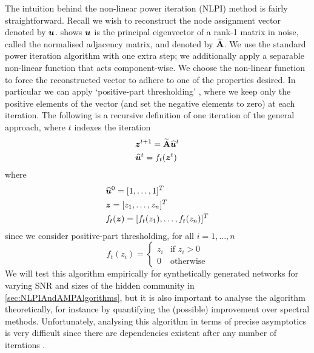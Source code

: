 The intuition behind the non-linear power iteration (NLPI) method is fairly straightforward.
Recall we wish to reconstruct the node assignment vector denoted by $\vecvar{u}$.  shows $\vecvar{u}$ is the principal eigenvector of a rank-1 matrix in noise, called the normalised adjacency matrix, and denoted by $\widetilde{\mathbf A}$.
We use the standard power iteration algorithm with one extra step; we additionally apply a separable non-linear function that acts component-wise.
We choose the non-linear function to force the reconstructed vector to adhere to one of the properties desired. In particular we can apply `positive-part thresholding' \cite{Mon13}, where we keep only the positive elements of the vector (and set the negative elements to zero) at each iteration.
The following is a recursive definition of one iteration of the general approach, where $t$ indexes the iteration
\begin{equation}
	\label{eq:NLPIAlgorithm}
	\begin{split}
		&\vecvar{z}^{t+1} = \widetilde{\matvar{A}} \widehat{\vecvar{u}}^{t} \\
		&\widehat{\vecvar{u}}^{t} = f_{t}(\vecvar{z}^{t})
	\end{split}
\end{equation}
where
\begin{equation}
	\label{eq:NLPIAlgorithmConditions}
	\begin{split}
		&\widehat{\vecvar{u}}^{0} = \transpose{[1,\dots,1]} \\
		&\vecvar{z} = \transpose{[z_{1},\dots,z_{n}]} \\
		&f_{t}(\vecvar{z}) = \transpose{[f_{t}(z_{1}),\dots,f_{t}(z_{n})]}
	\end{split}
\end{equation}
since we consider positive-part thresholding, for all $i=1,\dots,n$
\begin{equation}
	\label{eq:NLPIAlgorithmThresholding}
	f_{t}(z_{i}) =
	\begin{cases}
		z_{i}& \text{if } z_{i} > 0\\
		0 & \text{otherwise}
	\end{cases}
\end{equation}
We will test this algorithm empirically for synthetically generated networks for varying SNR and sizes of the hidden community in \cref{sec:NLPIAndAMPAlgorithms}, but it is also important to analyse the algorithm theoretically, for instance by quantifying the (possible) improvement over spectral methods.
Unfortunately, analysing this algorithm in terms of precise asymptotics is very difficult since there are dependencies existent after any number of iterations \cite{Mon13}.

